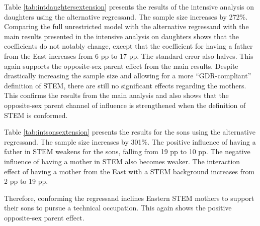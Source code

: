 \documentclass[a4paper, oneside, hyperfootnotes = false]{article}
\begin{document}
{Table \ref{tab:intdaughtersextension} presents the results of the intensive analysis on daughters using the alternative regressand.
The sample size increases by 272\%.
Comparing the full unrestricted model with the alternative regressand with the main results presented in the intensive analysis on daughters shows that the coefficients do not notably change, except that the coefficient for having a father from the East increases from 6 pp to 17 pp.
The standard error also halves.
This again supports the opposite-sex parent effect from the main results.
Despite drastically increasing the sample size and allowing for a more ``GDR-compliant'' definition of STEM, there are still no significant effects regarding the mothers.
This confirms the results from the main analysis and also shows that the opposite-sex parent channel of influence is strengthened when the definition of STEM is conformed.

Table \ref{tab:intsonsextension} presents the results for the sons using the alternative regressand.
The sample size increases by 301\%.
The positive influence of having a father in STEM weakens for the sons, falling from 19 pp to 10 pp.
The negative influence of having a mother in STEM also becomes weaker.
The interaction effect of having a mother from the East with a STEM background increases from 2 pp to 19 pp.

Therefore, conforming the regressand inclines Eastern STEM mothers to support their sons to pursue a technical occupation.
This again shows the positive opposite-sex parent effect.

\clearpage

}
\end{document}
